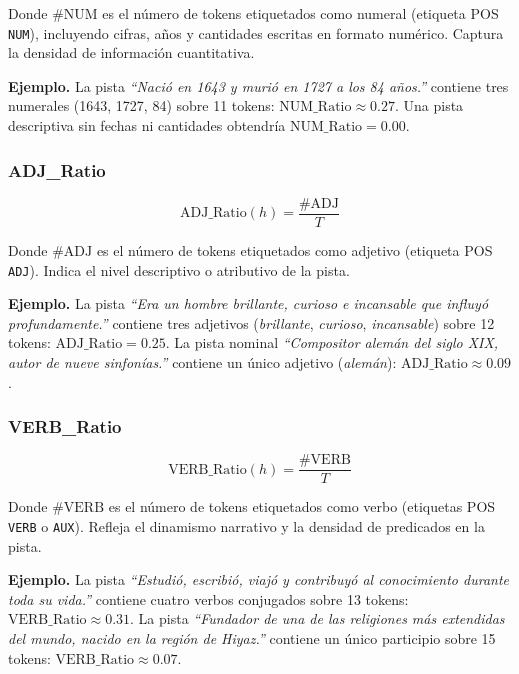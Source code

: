 \documentclass[../main.tex]{subfiles}
\begin{document}
Donde $\#\text{NUM}$ es el número de tokens etiquetados como numeral (etiqueta POS \texttt{NUM}), incluyendo cifras, años y cantidades escritas en formato numérico. Captura la densidad de información cuantitativa.

\medskip
\textbf{Ejemplo.} La pista \textit{``Nació en 1643 y murió en 1727 a los 84 años.''} contiene tres numerales (1643, 1727, 84) sobre 11 tokens: $\text{NUM\_Ratio} \approx 0.27$. Una pista descriptiva sin fechas ni cantidades obtendría $\text{NUM\_Ratio} = 0.00$.

\subsubsection{ADJ\_Ratio}

\begin{equation}
\text{ADJ\_Ratio}(h) =
\frac{\#\text{ADJ}}{T}
\end{equation}

Donde $\#\text{ADJ}$ es el número de tokens etiquetados como adjetivo (etiqueta POS \texttt{ADJ}). Indica el nivel descriptivo o atributivo de la pista.

\medskip
\textbf{Ejemplo.} La pista \textit{``Era un hombre brillante, curioso e incansable que influyó profundamente.''} contiene tres adjetivos (\textit{brillante}, \textit{curioso}, \textit{incansable}) sobre 12 tokens: $\text{ADJ\_Ratio} = 0.25$. La pista nominal \textit{``Compositor alemán del siglo XIX, autor de nueve sinfonías.''} contiene un único adjetivo (\textit{alemán}): $\text{ADJ\_Ratio} \approx 0.09$.

\subsubsection{VERB\_Ratio}

\begin{equation}
\text{VERB\_Ratio}(h) =
\frac{\#\text{VERB}}{T}
\end{equation}

Donde $\#\text{VERB}$ es el número de tokens etiquetados como verbo (etiquetas POS \texttt{VERB} o \texttt{AUX}). Refleja el dinamismo narrativo y la densidad de predicados en la pista.

\medskip
\textbf{Ejemplo.} La pista \textit{``Estudió, escribió, viajó y contribuyó al conocimiento durante toda su vida.''} contiene cuatro verbos conjugados sobre 13 tokens: $\text{VERB\_Ratio} \approx 0.31$. La pista \textit{``Fundador de una de las religiones más extendidas del mundo, nacido en la región de Hiyaz.''} contiene un único participio sobre 15 tokens: $\text{VERB\_Ratio} \approx 0.07$.
\end{document}
